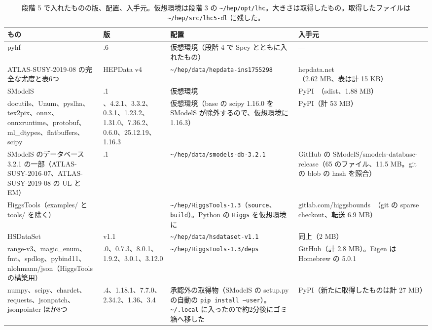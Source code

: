 \documentclass[a4paper,10pt]{ltjsarticle}
\newcommand{\pth}[1]{\texttt{\textasciitilde/}\nolinkurl{#1}}
\begin{document}
\begin{table}[htbp]
\centering\small
\caption{段階 5 で入れたものの版、配置、入手元。仮想環境は段階 3 の \pth{hep/opt/lhc}。大きさは取得したもの。取得したファイルは \pth{hep/src/lhc5-dl} に残した。}
\label{tab:lhc5}
\begin{tabularx}{\linewidth}{>{\raggedright\arraybackslash}p{3.4cm}>{\raggedright\arraybackslash}p{1.7cm}>{\raggedright\arraybackslash}X>{\raggedright\arraybackslash}p{4.0cm}}
\toprule
\textbf{もの} & \textbf{版} & \textbf{配置} & \textbf{入手元} \\
\midrule
pyhf & 0.7.6 & 仮想環境（段階 4 で Spey とともに入れたもの） & —~\cite{pyhf} \\
ATLAS-SUSY-2019-08 の完全な尤度と表6つ & HEPData v4 & \pth{hep/data/hepdata-ins1755298} & hepdata.net~\cite{atlas1lbb}（2.62 MB、表は計 15 KB） \\
SModelS & 3.2.1 & 仮想環境 & PyPI~\cite{smodels3}（sdist、1.88 MB） \\
docutils、Unum、pyslha、tex2pix、onnx、onnxruntime、protobuf、ml\_dtypes、flatbuffers、scipy & 0.23、4.2.1、3.3.2、0.3.1、1.23.2、1.31.0、7.36.2、0.6.0、25.12.19、1.16.3 & 仮想環境（base の scipy 1.16.0 を SModelS が除外するので、仮想環境に 1.16.3） & PyPI（計 53 MB） \\
SModelS のデータベース 3.2.1 の一部（ATLAS-SUSY-2016-07、ATLAS-SUSY-2019-08 の UL と EM） & 3.2.1 & \pth{hep/data/smodels-db-3.2.1} & GitHub の SModelS/smodels-database-release（65 のファイル、11.5 MB。git の blob の hash を照合） \\
HiggsTools（examples/ と tools/ を除く） & 1.3 & \pth{hep/HiggsTools-1.3}（\texttt{source}、\texttt{build}）。Python の \texttt{Higgs} を仮想環境に & gitlab.com/higgsbounds~\cite{higgstools}（git の sparse checkout、転送 6.9 MB） \\
HSDataSet & v1.1 & \pth{hep/data/hsdataset-v1.1} & 同上（2 MB） \\
range-v3、magic\_enum、fmt、spdlog、pybind11、nlohmann/json（HiggsTools の構築用） & 0.12.0、0.7.3、8.0.1、1.9.2、3.0.1、3.12.0 & \pth{hep/HiggsTools-1.3/deps} & GitHub（計 2.8 MB）。Eigen は Homebrew の 5.0.1 \\
numpy、scipy、chardet、requests、jsonpatch、jsonpointer ほか8つ & 2.5.4、1.18.1、7.7.0、2.34.2、1.36、3.4 & 承認外の取得物（SModelS の setup.py の自動の \texttt{pip install --user}）。\pth{.local} に入ったので約2分後にゴミ箱へ移した & PyPI（新たに取得したものは計 27 MB） \\
\bottomrule
\end{tabularx}
\end{table}
\end{document}
